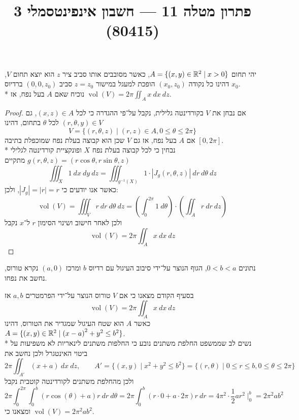 
\title{פתרון מטלה 11 --- חשבון אינפינטסמלי 3 (80415)}

\DeclareMathOperator\vol{vol}


\maketitle
\maketitleprint{}

\Question{}
\Subquestion{}
יהי תחום $A = \{ (x, y) \in \mathbb{R}^2 \mid x > 0 \}$, כאשר מסובבים אותו סביב ציר $z$ הוא יוצא תחום $V$, דהינו כל נקודה $(x_0, z_0)$ הופכת למעגל במישור $z = z_0$ סביב $(0, 0, z_0)$ ברדיוס $x_0$. \\*
נוכיח שאם $A$ בעל נפח, אז $\vol(V) = 2\pi \iint_A x\ dx\ dz$.
\begin{proof}
	אם נבחן את $V$ בקורדינטה גלילית, נקבל על־פי ההגדרה כי לכל $(x, z) \in A$, גם $(r, \theta, y) \in V$ לכל $\theta$ בתחום, דהינו
	\[
		V = \{ (r, \theta, z) \mid (r, z) \in A, 0 \le \theta \le 2\pi \}
	\]
	אם $A$ בעל נפח, אז גם $V$ שכן הוא קבוצה בעלת נפח שמוכפלת בתיבה $[0, 2\pi]$. \\*
	נבחין כי לכל קבוצה בעלת נפח $X$ ופונקציית קורדינטה לגלילי $g(r, \theta, z) = (r \cos \theta, r \sin \theta, z)$ מתקיים
	\[
		\iiint_X 1\ dx\ dy\ dz = \iiint_{g^{-1}(X)} 1 \cdot |J_g(r, \theta, z)|\ dr\ d\theta\ dz
	\]
	כאשר אנו יודעים כי $|J_g| = |r| = r$, ולכן:
	\[
		\vol(V) = \iiint_V r\ dr\ d\theta\ dz
		= \left( \int_0^{2\pi} 1\ d\theta \right) \cdot \left( \iint_A r\ dr\ dz \right)
	\]
	ולכן לאחר חישוב ושינוי הסימון $r$ ל־$x$ נקבל
	\[
		\vol(V) = 2\pi \iint_A x\ dx\ dz
	\]
\end{proof}

\Subquestion{}
נתונים $0 < b < a$, הגוף הנוצר על־ידי סיבוב העיגול עם רדיוס $b$ ומרכז $(a, 0)$ נקרא טורוס, נחשב את נפחו.

בסעיף הקודם מצאנו כי אם $V$ טורוס הנוצר על־ידי הפרמטרים $a, b$ אז
\[
	\vol(V) = 2\pi \iint_A x\ dx\ dz
\]
כאשר $A$ הוא שטח העיגול שמגדיר את הטורוס, דהינו $A = \{ (x, y) \in \mathbb{R}^2 \mid {(x - a)}^2 + y^2 \le b^2 \}$. \\*
נשים לב שממשפט החלפת משתנים נובע כי החלפות משתנים לינאריות לא משפיעות על ביטוי האינטגרל ולכן נחשב את
\[
	2\pi \iint_{A'} (x + a)\ dx\ dz,
	\qquad
	A' = \{ (x, y) \mid x^2 + y^2 \le b^2 \} = \{ (r, \theta) \mid 0 \le r \le b, 0 \le \theta \le 2\pi \}
\]
ולכן מהחלפת משתנים לקורדינטה קוטבית נקבל
\[
	2\pi \int_0^{2\pi} \int_0^b (r \cos(\theta) + a) r\ dr\ d\theta
	= 2\pi \int_0^b (r \cdot 0 + a \cdot 2\pi) r\ dr
	= 4\pi^2 \cdot \frac{1}{2} ar^2 \mid_0^b
	= 2\pi^2 a b^2
\]
ומצאנו כי $\vol(V) = 2\pi^2 a b^2$.

